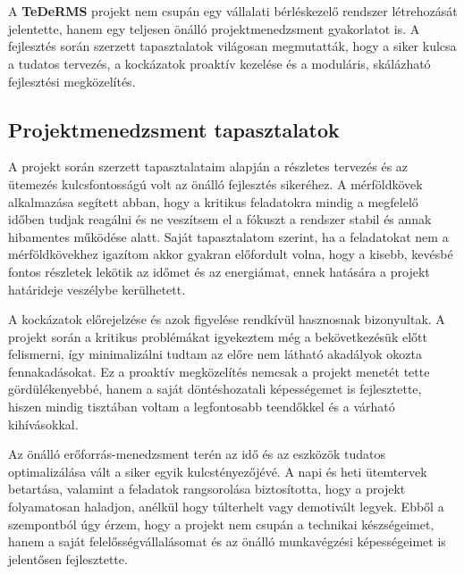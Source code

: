 \chapter{\lessons}

A \textbf{TeDeRMS} projekt nem csupán egy vállalati bérléskezelő rendszer létrehozását jelentette, 
hanem egy teljesen önálló projektmenedzsment gyakorlatot is. 
A fejlesztés során szerzett tapasztalatok világosan megmutatták, hogy a siker kulcsa a tudatos tervezés, 
a kockázatok proaktív kezelése és a moduláris, skálázható fejlesztési megközelítés.

\section{Projektmenedzsment tapasztalatok}

A projekt során szerzett tapasztalataim alapján a részletes tervezés és az ütemezés kulcsfontosságú volt
az önálló fejlesztés sikeréhez. A mérföldkövek alkalmazása segített abban, hogy a kritikus feladatokra 
mindig a megfelelő időben tudjak reagálni és ne veszítsem el a fókuszt a rendszer stabil és annak hibamentes működése alatt. 
Saját tapasztalatom szerint, ha a feladatokat nem a mérföldkövekhez igazítom akkor gyakran előfordult volna, 
hogy a kisebb, kevésbé fontos részletek lekötik az időmet és az energiámat, ennek hatására a projekt határideje veszélybe kerülhetett.

A kockázatok előrejelzése és azok figyelése rendkívül hasznosnak bizonyultak. A projekt során a kritikus problémákat 
igyekeztem még a bekövetkezésük előtt felismerni, így minimalizálni tudtam az előre nem látható akadályok okozta fennakadásokat. 
Ez a proaktív megközelítés nemcsak a projekt menetét tette gördülékenyebbé, hanem 
a saját döntéshozatali képességemet is fejlesztette, hiszen mindig tisztában voltam a legfontosabb teendőkkel és a várható kihívásokkal.

Az önálló erőforrás-menedzsment terén az idő és az eszközök tudatos optimalizálása 
vált a siker egyik kulcstényezőjévé. A napi és heti ütemtervek betartása, valamint a 
feladatok rangsorolása biztosította, hogy a projekt folyamatosan haladjon, anélkül hogy 
túlterhelt vagy demotivált legyek. Ebből a szempontból úgy érzem, hogy a projekt 
nem csupán a technikai készségeimet, hanem a saját felelősségvállalásomat és az önálló munkavégzési képességeimet is jelentősen fejlesztette.

